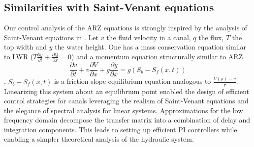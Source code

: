 \documentclass[preprint]{elsarticle}
\begin{document}
\subsection{Similarities with Saint-Venant equations}
Our control analysis of the ARZ equations is strongly
inspired by the analysis of Saint-Venant equations in \cite{litrico2009modeling}.
Let $v$ the fluid velocity in a canal, $q$ the flux, $T$ the top
width and $y$ the water height. One has a mass conservation equation
similar to LWR ($T\frac{\partial y}{\partial t}+\frac{\partial Q}{\partial x}=0$)
and a momentum equation structurally similar to ARZ 
\begin{equation}
\frac{\partial v}{\partial t}+v\frac{\partial V}{\partial x}+g\frac{\partial y}{\partial x}=g\left(S_{b}-S_{f}\left(x,t\right)\right)
\end{equation}
.
$S_{b}-S_{f}\left(x,t\right)$ is a friction slope equilibrium equation
analogous to $\frac{V\left(\rho\right)-v}{\tau}$. Linearizing this
system about an equilibrium point enabled the design of efficient
control strategies for canals leveraging the realism of Saint-Venant
equations and the elegance of spectral analysis for linear systems.
Approximations for the low frequency domain decompose the transfer
matrix into a combination of delay and integration components. This
leads to setting up efficient PI controllers while enabling a simpler
theoretical analysis of the hydraulic system.
\end{document}
